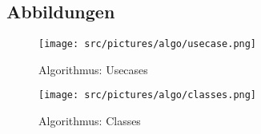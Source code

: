 \begin{appendix}

    \chapter{Abbildungen}

        \begin{figure}[ht]
            \centering
            \texttt{[image: src/pictures/algo/usecase.png]}
            \caption{Algorithmus: Usecases}
            \label{img:algo:usecases}
        \end{figure}

        \begin{figure}[ht]
            \centering
            \texttt{[image: src/pictures/algo/classes.png]}
            \caption{Algorithmus: Classes}
            \label{img:algo:classes}
        \end{figure}

\end{appendix}

